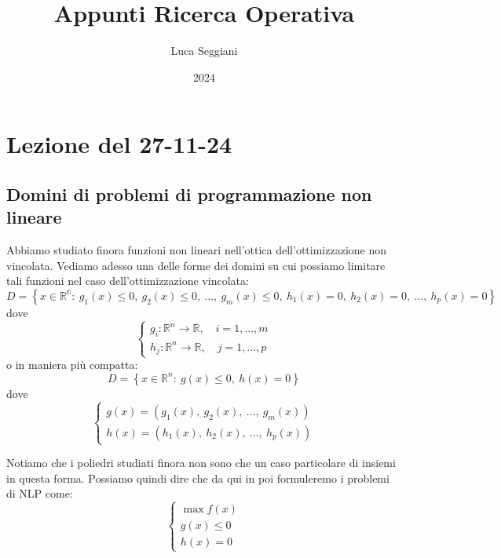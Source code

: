 \documentclass[a4paper,11pt]{article}
\title{Appunti Ricerca Operativa}
\author{Luca Seggiani}
\date{2024}
\begin{document}
\section{Lezione del 27-11-24}

\thispagestyle{empty}
\pagestyle{fancy}

\subsection{Domini di problemi di programmazione non lineare}
Abbiamo studiato finora funzioni non lineari nell'ottica dell'ottimizzazione non vincolata.
Vediamo adesso una delle forme dei domini su cui possiamo limitare tali funzioni nel caso dell'ottimizzazione vincolata:
$$
D = \left\{ x \in \mathbb{R^n}: \ g_1(x) \leq 0, \ g_2(x) \leq 0, \ ..., \ g_m(x) \leq 0, \
							h_1(x) = 0, \ h_2(x) = 0, \ ..., \ h_p(x) = 0 \right\}
$$
dove
\[
	\begin{cases}
		g_i: \mathbb{R}^n \rightarrow \mathbb{R}, \quad i = 1, ..., m \\ 
		h_j: \mathbb{R}^n \rightarrow \mathbb{R}, \quad j = 1, ..., p
	\end{cases}
\]
o in maniera più compatta:
$$
D = \left\{ x \in \mathbb{R}^n: \ g(x) \leq 0, \ h(x) = 0 \right\}
$$
dove
\[
	\begin{cases}
		g(x) = \left( g_1(x), \ g_2(x), \ ..., \ g_m(x) \right) \\	
		h(x) = \left( h_1(x), \ h_2(x), \ ..., \ h_p(x) \right)	
	\end{cases}
\]

Notiamo che i poliedri studiati finora non sono che un caso particolare di insiemi in questa forma.
Possiamo quindi dire che da qui in poi formuleremo i problemi di NLP come:
\[
	\begin{cases}
		\max f(x) \\ 
		g(x) \leq 0 \\ 
		h(x) = 0
	\end{cases}
\]
\end{document}
